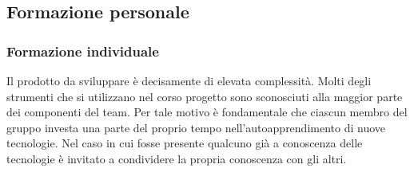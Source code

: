 \documentclass[../norme-di-progetto.tex]{subfiles}
\begin{document}
\subsection{Formazione personale}
\label{sub:formazione personale}
\subsubsection{Formazione individuale}
\label{subs:formazione individuale}
Il prodotto da sviluppare è decisamente di elevata complessità. Molti degli strumenti che si utilizzano nel corso  progetto sono sconosciuti alla maggior parte dei componenti del team. Per tale motivo è fondamentale che ciascun membro del gruppo investa una parte del proprio tempo nell'autoapprendimento di nuove tecnologie. Nel caso in cui fosse presente qualcuno già a conoscenza delle tecnologie è invitato a condividere la propria conoscenza con gli altri.
\end{document}

